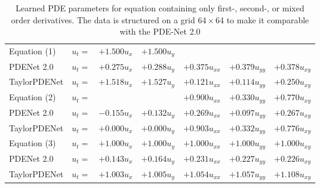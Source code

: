 \documentclass[runningheads]{llncs}
\begin{document}
\begin{table}[!t]
\caption{Learned PDE parameters for equation containing only first-, second-, or mixed order derivatives. The data is structured on a grid $64\times 64$ to make it comparable with the PDE-Net 2.0}\label{tab:param_g}
\centering
\begin{tabular}{l@{\hskip 0.1in}lrrrrr}
\toprule
Equation (1) &  $u_{t} =$ & $+1.500 u_{x}$ & $+1.500 u_{y}$ & & & \\
PDENet 2.0   &  $u_{t} =$ & $+0.275 u_{x}$ & $+0.288 u_{y}$ & $+0.375 u_{xx}$ & $+0.379 u_{yy}$ & $+0.378 u_{xy}$\\
TaylorPDENet &  $u_{t} =$ & $+1.518 u_{x}$ & $+1.527 u_{y}$ & $+0.121 u_{xx}$ & $+0.114 u_{yy}$ & $+0.250 u_{xy}$\\
\midrule
Equation (2) &  $u_{t} =$ & & & $+0.900 u_{xx}$ & $+0.330 u_{yy}$ & $+0.770 u_{xy}$\\
PDENet 2.0   &  $u_{t} =$ & $-0.155 u_{x}$ & $+0.132 u_{y}$ & $+0.269 u_{xx}$ & $+0.097 u_{yy}$ & $+0.267 u_{xy}$\\
TaylorPDENet &  $u_{t} =$ & $+0.000 u_{x}$ & $+0.000 u_{y}$ & $+0.903 u_{xx}$ & $+0.332 u_{yy}$ & $+0.776 u_{xy}$\\
\midrule
Equation (3) &  $u_{t} =$ & $+1.000 u_{x}$ & $+1.000 u_{y}$ & $+1.000 u_{xx}$ & $+1.000 u_{yy}$ & $+1.000 u_{xy}$\\
PDENet 2.0   &  $u_{t} =$ & $+0.143 u_{x}$ & $+0.164 u_{y}$ & $+0.231 u_{xx}$ & $+0.227 u_{yy}$ & $+0.226 u_{xy}$\\
TaylorPDENet &  $u_{t} =$ & $+1.003 u_{x}$ & $+1.005 u_{y}$ & $+1.054 u_{xx}$ & $+1.057 u_{yy}$ & $+1.108 u_{xy}$\\
\bottomrule
\end{tabular}
\end{table}
%
\end{document}
